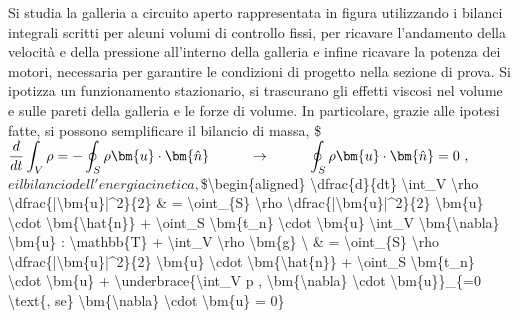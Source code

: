 \documentclass[letterpaper,10pt,italian]{jupyterBook}
\begin{document}
\sphinxAtStartPar
Si studia la galleria a circuito aperto rappresentata in figura
utilizzando i bilanci integrali scritti per alcuni volumi di controllo
fissi, per ricavare l’andamento della velocità e della pressione
all’interno della galleria e infine ricavare la potenza dei motori,
necessaria per garantire le condizioni di progetto nella sezione di
prova. Si ipotizza un funzionamento stazionario, si trascurano gli
effetti viscosi nel volume e sulle pareti della galleria e le forze di
volume. In particolare, grazie alle ipotesi fatte, si possono
semplificare il bilancio di massa, \$\(\begin{aligned}
 & \dfrac{d}{dt} \int_V \rho = - \oint_{S} \rho \bm{u} \cdot \bm{\hat{n}} 
 \hspace{1.0cm} \rightarrow \hspace{1.0cm} \oint_{S} \rho \bm{u} \cdot \bm{\hat{n}} = 0 \ ,
\end{aligned}\)\( e il bilancio dell'energia cinetica, \)\$\textbackslash{}begin\{aligned\}
\textbackslash{}dfrac\{d\}\{dt\} \textbackslash{}int\_V \textbackslash{}rho \textbackslash{}dfrac\{|\textbackslash{}bm\{u\}|\textasciicircum{}2\}\{2\} \& = \sphinxhyphen{} \textbackslash{}oint\_\{S\} \textbackslash{}rho \textbackslash{}dfrac\{|\textbackslash{}bm\{u\}|\textasciicircum{}2\}\{2\} \textbackslash{}bm\{u\} \textbackslash{}cdot \textbackslash{}bm\{\textbackslash{}hat\{n\}\} + \textbackslash{}oint\_S \textbackslash{}bm\{t\_n\} \textbackslash{}cdot \textbackslash{}bm\{u\} \sphinxhyphen{} \textbackslash{}int\_V \textbackslash{}bm\{\textbackslash{}nabla\} \textbackslash{}bm\{u\} : \textbackslash{}mathbb\{T\} + \textbackslash{}int\_V \textbackslash{}rho \textbackslash{}bm\{g\} \textbackslash{}
\& = \sphinxhyphen{} \textbackslash{}oint\_\{S\} \textbackslash{}rho \textbackslash{}dfrac\{|\textbackslash{}bm\{u\}|\textasciicircum{}2\}\{2\} \textbackslash{}bm\{u\} \textbackslash{}cdot \textbackslash{}bm\{\textbackslash{}hat\{n\}\} + \textbackslash{}oint\_S \textbackslash{}bm\{t\_n\} \textbackslash{}cdot \textbackslash{}bm\{u\} +
\textbackslash{}underbrace\{\textbackslash{}int\_V  p , \textbackslash{}bm\{\textbackslash{}nabla\} \textbackslash{}cdot \textbackslash{}bm\{u\}\}\_\{=0 \textbackslash{}text\{, se\} \textbackslash{}bm\{\textbackslash{}nabla\} \textbackslash{}cdot \textbackslash{}bm\{u\} = 0\}
\end{document}
